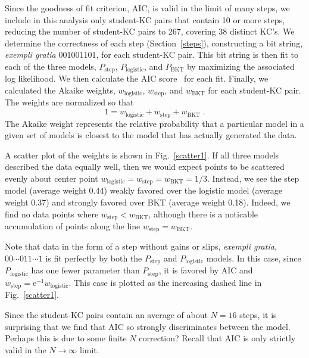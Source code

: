 \documentclass{acmlarge-edm}
\begin{document}
Since the goodness of fit criterion, AIC, is valid in the limit of
many steps, we include in this analysis only student-KC pairs that
contain 10 or more steps, reducing the number of student-KC pairs to
267, covering 38 distinct KC's.  We determine the correctness of each
step (Section~\ref{steps}), constructing a bit string, {\em exempli
gratia} 001001101, for each student-KC pair.  This bit string is then
fit to each of the three models, $P_\mathrm{step}$,
$P_\mathrm{logistic}$, and $P_\mathrm{BKT}$ by maximizing the
associated log likelihood.
We then calculate the AIC score~\cite{burnham_model_2002} for each fit.  
Finally, we calculated the Akaike weights, $w_\mathrm{logistic}$, $w_\mathrm{step}$, and $w_\mathrm{BKT}$ for each student-KC pair.
The weights are normalized so that
%
\begin{equation}
   1=w_\mathrm{logistic}+ w_\mathrm{step} + w_\mathrm{BKT} \; .
\end{equation}
%
The Akaike weight represents the relative probability that
a particular model in a given set of models is closest
to the model that has actually generated the data. 

A scatter plot of the weights is shown in Fig.~\ref{scatter1}.
If all three models described the data equally well, then
we would expect points to be scattered evenly about 
center point $w_\mathrm{logistic}= w_\mathrm{step}= w_\mathrm{BKT}=1/3$.
Instead, we see the step model (average weight 0.44) weakly 
favored over the logistic model (average weight 0.37) and 
strongly favored over BKT (average weight 0.18).  Indeed, we 
find no data points where $w_\mathrm{step}< w_\mathrm{BKT}$,
although there is a noticable accumulation of points along the line 
$w_\mathrm{step}= w_\mathrm{BKT}$.

Note that data in the form of a step without
gains or slips, {\it exempli gratia}, $00\cdots 011\cdots 1$
is fit perfectly by both the $P_\mathrm{step}$ and 
$P_\mathrm{logistic}$ models.  
In this case, since $P_\mathrm{logistic}$ has one fewer parameter
than $P_\mathrm{step}$, it is favored by AIC and
$w_\mathrm{step}=\mathrm{e}^{-1} w_\mathrm{logistic}$.  This case is
plotted as the increasing dashed line in Fig.~\ref{scatter1}.

Since the student-KC pairs contain an average of about $N=16$ 
steps, it is surprising that we find that AIC so strongly
discriminates between the model.  Perhaps this is due to
some finite $N$ correction?  Recall that AIC is only 
strictly valid in the $N\to\infty$ limit.
\end{document}
